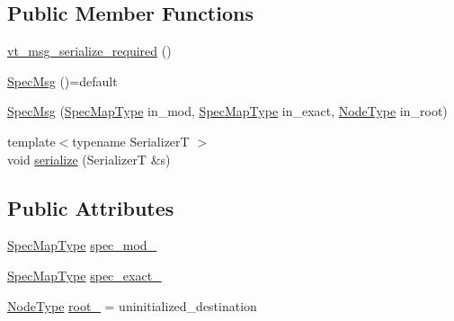 \subsection*{Public Member Functions}
\begin{DoxyCompactItemize}
\item 
\hyperlink{structvt_1_1utils_1_1file__spec_1_1_file_spec_1_1_spec_msg_a4d9d001fa0b8889b01e295355a9c3b58}{vt\+\_\+msg\+\_\+serialize\+\_\+required} ()
\item 
\hyperlink{structvt_1_1utils_1_1file__spec_1_1_file_spec_1_1_spec_msg_a2fc3a431dd5feea1b2ce977c0f317460}{Spec\+Msg} ()=default
\item 
\hyperlink{structvt_1_1utils_1_1file__spec_1_1_file_spec_1_1_spec_msg_aa59cddd7bb440239a815d42335088f87}{Spec\+Msg} (\hyperlink{structvt_1_1utils_1_1file__spec_1_1_file_spec_a368a4ab8bf689e0b533abac71ae9393b}{Spec\+Map\+Type} in\+\_\+mod, \hyperlink{structvt_1_1utils_1_1file__spec_1_1_file_spec_a368a4ab8bf689e0b533abac71ae9393b}{Spec\+Map\+Type} in\+\_\+exact, \hyperlink{namespacevt_a866da9d0efc19c0a1ce79e9e492f47e2}{Node\+Type} in\+\_\+root)
\item 
{\footnotesize template$<$typename SerializerT $>$ }\\void \hyperlink{structvt_1_1utils_1_1file__spec_1_1_file_spec_1_1_spec_msg_afd1384dd77fb18de2baaaa0ed72876bd}{serialize} (SerializerT \&s)
\end{DoxyCompactItemize}
\subsection*{Public Attributes}
\begin{DoxyCompactItemize}
\item 
\hyperlink{structvt_1_1utils_1_1file__spec_1_1_file_spec_a368a4ab8bf689e0b533abac71ae9393b}{Spec\+Map\+Type} \hyperlink{structvt_1_1utils_1_1file__spec_1_1_file_spec_1_1_spec_msg_ac68c7bf1a220b58f863eb4b2d8c9dd21}{spec\+\_\+mod\+\_\+}
\item 
\hyperlink{structvt_1_1utils_1_1file__spec_1_1_file_spec_a368a4ab8bf689e0b533abac71ae9393b}{Spec\+Map\+Type} \hyperlink{structvt_1_1utils_1_1file__spec_1_1_file_spec_1_1_spec_msg_a1be8df83618a2e2b7cdf857ae292c0fd}{spec\+\_\+exact\+\_\+}
\item 
\hyperlink{namespacevt_a866da9d0efc19c0a1ce79e9e492f47e2}{Node\+Type} \hyperlink{structvt_1_1utils_1_1file__spec_1_1_file_spec_1_1_spec_msg_acb2644a4ab0bbbd7bd5075b9ce010066}{root\+\_\+} = uninitialized\+\_\+destination
\end{DoxyCompactItemize}
